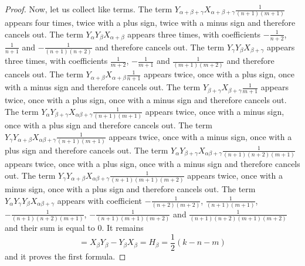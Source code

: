 \documentclass[twoside,a4paper,12pt]{article}
\theoremstyle{definition}
\begin{document}
\begin{proof}
	Now, let us collect like terms.
	The term $Y_{\alpha+\beta+\gamma}X_{\alpha+\beta+\gamma}$
	appears four times, twice with a plus sign, twice with a minus sign
	and therefore cancels out.
	The term $Y_\alpha Y_\beta X_{\alpha+\beta}$ appears three times, with
	coefficients $-$, $$ and $-$
	and therefore cancels out.
	The term $Y_\gamma Y_\beta X_{\beta+\gamma}$ appears three times, with
	coefficients $$, $-$ and $$
	and therefore cancels out.
	The term $Y_{\alpha+\beta}X_{\alpha+\beta}$
	appears twice, once with a plus sign, once with a minus sign
	and therefore cancels out.
	The term $Y_{\beta+\gamma}X_{\beta+\gamma}$
	appears twice, once with a plus sign, once with a minus sign
	and therefore cancels out.
	The term $Y_\alpha Y_{\beta+\gamma}X_{\alpha\beta+\gamma}$
	appears twice, once with a minus sign, once with a plus sign
	and therefore cancels out.
	The term $Y_\gamma Y_{\alpha+\beta}X_{\alpha\beta+\gamma}$
	appears twice, once with a minus sign, once with a plus sign
	and therefore cancels out.
	The term $Y_\alpha Y_{\beta+\gamma}X_{\alpha\beta+\gamma}
	$ appears twice, once with a plus sign, once with
	a minus sign and therefore cancels out.
	The term $Y_\gamma Y_{\alpha+\beta}X_{\alpha\beta+\gamma}
	$ appears twice, once with a minus sign, once with
	a plus sign and therefore cancels out.
	The term $Y_\alpha Y_\gamma Y_\beta X_{\alpha\beta+\gamma}$ appears with
	coefficient $-$, $$,
	$-$, $-$ and
	$$ and their sum is equal to 0. It remains
	\begin{equation*}
		=X_\beta Y_\beta-Y_\beta X_\beta=H_\beta=\frac12(k-n-m)
	\end{equation*}
	and it proves the first formula.
\end{proof}
\end{document}
